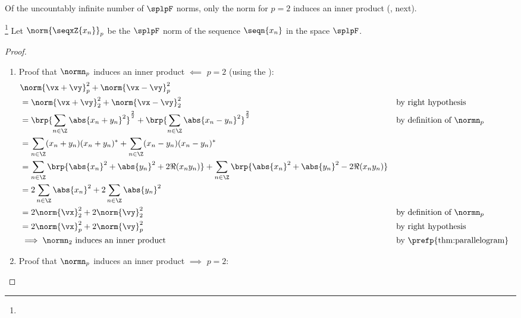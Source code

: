 Of the uncountably infinite number of $\splpF$ norms, only the norm for $p=2$ induces an inner product
(, next).
\begin{proposition}
\footnote{
  }
\label{prop:lp_norm2ip}
Let $\norm{\seqxZ{x_n}}_p$ be the $\splpF$ norm of the sequence $\seqn{x_n}$ in the space $\splpF$.
\end{proposition}
\begin{proof}
\begin{enumerate}
  \item Proof that $\normn_p$ induces an inner product $\impliedby$ $p=2$
        (using the  ):
    \begin{align*}
      &\norm{\vx+\vy}_p^2 + \norm{\vx-\vy}_p^2
      \\&= \norm{\vx+\vy}_2^2 + \norm{\vx-\vy}_2^2
        && \text{by right hypothesis}
      \\&= \brp{\sum_{n\in\Z} \abs{x_n+y_n}^2}^\frac{2}{2} +
           \brp{\sum_{n\in\Z} \abs{x_n-y_n}^2}^\frac{2}{2}
        && \text{by definition of $\normn_p$}
      \\&= \sum_{n\in\Z} (x_n+y_n)(x_n+y_n)^\ast +
           \sum_{n\in\Z} (x_n-y_n)(x_n-y_n)^\ast
      \\&= \sum_{n\in\Z} \brp{\abs{x_n}^2 + \abs{y_n}^2 + 2\Re(x_ny_n)} +
           \sum_{n\in\Z} \brp{\abs{x_n}^2 + \abs{y_n}^2 - 2\Re(x_ny_n)}
      \\&= 2\sum_{n\in\Z} \abs{x_n}^2 + 2\sum_{n\in\Z}\abs{y_n}^2
      \\&= 2\norm{\vx}_2^2 + 2\norm{\vy}_2^2
        && \text{by definition of $\normn_p$}
      \\&= 2\norm{\vx}_p^2 + 2\norm{\vy}_p^2
        && \text{by right hypothesis}
      \\&\implies \text{$\normn_2$ induces an inner product}
        && \text{by \prefp{thm:parallelogram}}
    \end{align*}

  \item Proof that $\normn_p$ induces an inner product $\implies$ $p=2$:
    \begin{enumerate}


\end{enumerate}
\end{enumerate}
\end{proof}
